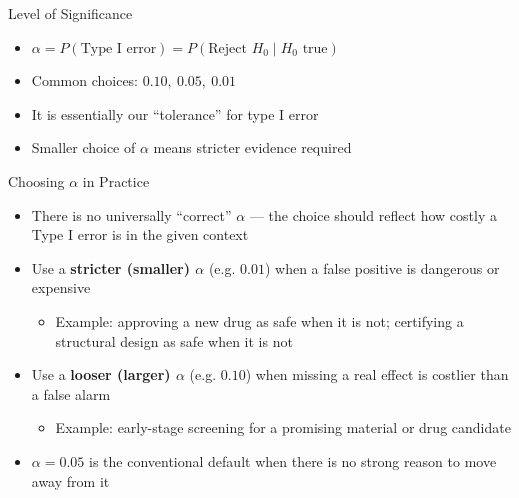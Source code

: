 \documentclass[12pt, aspectratio=169]{beamer}
\begin{document}


    \begin{frame}{Level of Significance}
        \begin{itemize}
            \item $\alpha = P(\text{Type I error}) = P(\text{Reject } H_0 \mid H_0 \text{ true})$
            \item Common choices: $0.10,\ 0.05,\ 0.01$
            \item It is essentially our ``tolerance'' for type I error
            \item Smaller choice of $\alpha$ means stricter evidence required
        \end{itemize}
    \end{frame}


    \begin{frame}{Choosing $\alpha$ in Practice}
        \begin{itemize}
            \item There is no universally ``correct'' $\alpha$ --- the choice should reflect how costly a Type I error is in the given context
            \item Use a \textbf{stricter (smaller) $\alpha$} (e.g. $0.01$) when a false positive is dangerous or expensive
            \begin{itemize}
                \item Example: approving a new drug as safe when it is not; certifying a structural design as safe when it is not
            \end{itemize}
            \item Use a \textbf{looser (larger) $\alpha$} (e.g. $0.10$) when missing a real effect is costlier than a false alarm
            \begin{itemize}
                \item Example: early-stage screening for a promising material or drug candidate
            \end{itemize}
            \item $\alpha = 0.05$ is the conventional default when there is no strong reason to move away from it
        \end{itemize}
    \end{frame}
\end{document}
